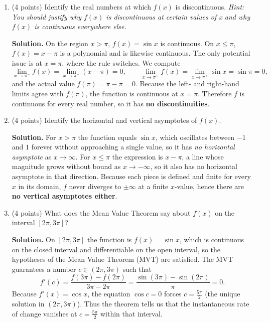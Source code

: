 \documentclass[12pt]{article}
\begin{document}
\begin{enumerate}[label=(\alph*)]
    \item (4 points) Identify the real numbers at which $f(x)$ is discontinuous.
    \textit{Hint: You should justify why $f(x)$ is discontinuous at certain values of x and why $f(x)$ is continuous everywhere else.}

    {\color{blue}\textbf{Solution.} On the region $x>\pi$, $f(x)=\sin x$ is continuous. On $x\leq\pi$, $f(x)=x-\pi$ is a polynomial and is likewise continuous. The only potential issue is at $x=\pi$, where the rule switches. We compute
    \[
        \lim_{x\to \pi^-}f(x)=\lim_{x\to\pi^-}(x-\pi)=0,\qquad \lim_{x\to \pi^+}f(x)=\lim_{x\to\pi^+}\sin x=\sin\pi=0,
    \]
    and the actual value $f(\pi)=\pi-\pi=0$. Because the left- and right-hand limits agree with $f(\pi)$, the function is continuous at $x=\pi$. Therefore $f$ is continuous for every real number, so it has \textbf{no discontinuities}.}
    
    \item (4 points) Identify the horizontal and vertical asymptotes of $f(x)$.

    {\color{blue}\textbf{Solution.} For $x>\pi$ the function equals $\sin x$, which oscillates between $-1$ and $1$ forever without approaching a single value, so it has \emph{no horizontal asymptote} as $x\to\infty$. For $x\leq\pi$ the expression is $x-\pi$, a line whose magnitude grows without bound as $x\to -\infty$, so it also has no horizontal asymptote in that direction. Because each piece is defined and finite for every $x$ in its domain, $f$ never diverges to $\pm\infty$ at a finite $x$-value, hence there are \textbf{no vertical asymptotes either}.}

    \item (4 points) What does the Mean Value Theorem say about $f(x)$ on the interval $[2\pi, 3\pi]$?

    {\color{blue}\textbf{Solution.} On $[2\pi,3\pi]$ the function is $f(x)=\sin x$, which is continuous on the closed interval and differentiable on the open interval, so the hypotheses of the Mean Value Theorem (MVT) are satisfied. The MVT guarantees a number $c\in(2\pi,3\pi)$ such that
    \[
        f'(c)=\frac{f(3\pi)-f(2\pi)}{3\pi-2\pi}=\frac{\sin(3\pi)-\sin(2\pi)}{\pi}=0.
    \]
    Because $f'(x)=\cos x$, the equation $\cos c=0$ forces $c=\tfrac{5\pi}{2}$ (the unique solution in $(2\pi,3\pi)$). Thus the theorem tells us that the instantaneous rate of change vanishes at $c=\tfrac{5\pi}{2}$ within that interval.}
    
\end{enumerate}
\end{document}
